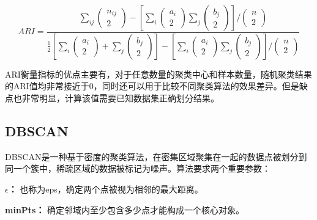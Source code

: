 \begin{equation}
	ARI = \frac{\sum_{i j}\left(\begin{array}{c}
				n_{i j} \\
				2
			\end{array}\right)-\left[\sum_i\left(\begin{array}{c}
				a_i \\
				2
			\end{array}\right) \sum_j\left(\begin{array}{c}
				b_j \\
				2
			\end{array}\right)\right] /\left(\begin{array}{c}
				n \\
				2
			\end{array}\right)}{\frac{1}{2}\left[\sum_i\left(\begin{array}{c}
				a_i \\
				2
			\end{array}\right)+\sum_j\left(\begin{array}{c}
				b_j \\
				2
			\end{array}\right)\right]-\left[\sum_i\left(\begin{array}{c}
				a_i \\
				2
			\end{array}\right) \sum_j\left(\begin{array}{c}
				b_j \\
				2
			\end{array}\right)\right] /\left(\begin{array}{c}
				n \\
				2
			\end{array}\right)}
	\label{equ_ari}
\end{equation}

ARI衡量指标的优点主要有，对于任意数量的聚类中心和样本数量，随机聚类结果的ARI值均非常接近于0，同时还可以用于比较不同聚类算法的效果差异。但是缺点也非常明显，计算该值需要已知数据集正确划分结果。


\subsection{DBSCAN}
DBSCAN是一种基于密度的聚类算法，在密集区域聚集在一起的数据点被划分到同一个簇中，稀疏区域的数据被标记为噪声\cite{khan2014dbscan}。算法要求两个重要参数：
\begin{compactitem}
	\item \textbf{$\epsilon$：} 也称为eps，确定两个点被视为相邻的最大距离。
	\item \textbf{minPts：} 确定邻域内至少包含多少点才能构成一个核心对象。
\end{compactitem}

